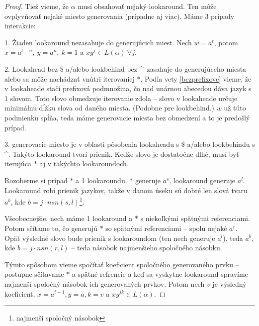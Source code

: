 \documentclass{svk_long_sk}
\begin{document}
\begin{proof}
Tiež vieme, že $\alpha$ musí obsahovať nejaký lookaround. Ten môže ovplyvňovať nejaké miesto generovania (prípadne aj viac). Máme 3 prípady interakcie:

1. Žiaden lookaround nezasahuje do generujúcich miest. Nech $w=a^t$, potom $x=a^{t-n},~y=a^n,~k=1$ a $xy^j\in L(\alpha) ~\forall j$.

2. Lookahead bez \$ a/alebo lookbehind bez \textasciicircum ~zasahuje do generujúceho miesta alebo sa môže nachádzať vnútri iterovaniej $*$. Podľa vety \ref{bezprefixove} vieme, že v lookaheade stačí prefixová podmnožina, čo nad unárnou abecedou dáva jazyk s 1 slovom. Toto slovo obmedzuje iterovanie zdola -- slovo v lookaheade určuje minimálnu dĺžku slova od daného miesta. (Podobne pre lookbehind.) $w$ už túto podmienku spĺňa, teda máme generovacie miesta bez obmedzení a to je predošlý prípad.

3. generovacie miesto je v oblasti pôsobenia lookaheadu s \$ a/alebo lookbehindu s \textasciicircum. Takýto lookaround tvorí prienik. Keďže slovo je dostatočne dlhé, musí byť iterujúca $*$ aj v takýchto lookaroundoch.

Rozoberme si prípad $*$ a 1 lookaroundu. $*$ generuje $a^s$, lookaround generuje $a^l$. Lookaround robí prienik jazykov, takže v danom úseku sú dobré len slová tvaru $a^b$, kde $b=j\cdot nsn(s,l)$\footnote{najmenší spoločný násobok}.

Všeobecnejšie, nech máme 1 lookaround a $*$ s niekoľkými spätnými referenciami. Potom sčítame to, čo generujú $*$ so spätnými referenciami -- spolu nejaké $a^r$. Opäť výsledné slovo bude prienik s lookaroundom (ten nech generuje $a^l$), teda $a^b$, kde $b=j\cdot nsn(r,l)$ -- teda násobok najmenšieho spoločného násobku.

Týmto spôsobom vieme spočítať koeficient spoločného generovaného prvku -- postupne sčítavame $*$ a  spätné refrencie a keď sa vyskytne lookaround spravíme najmenší spoločný násobok ich generovaných prvkov. Potom nech $v$ je výsledný koeficient, $x=a^{t-1}, y=a, k=v$ a $xy^{jk}\in L(\alpha)$.
\end{proof}
\end{document}
